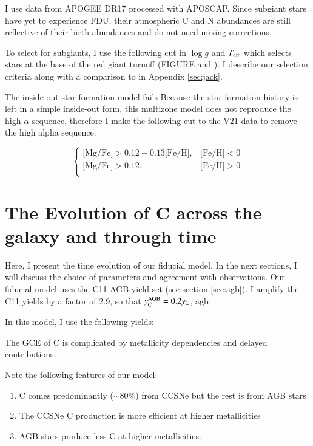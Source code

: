 \documentclass[12pt,oneside]{report}
\newcommand{\Ycagb}{\ensuremath{y_{\rm C}^{\rm AGB}}}
\begin{document}
I use data from APOGEE DR17 \citep{apogee17} processed with APOSCAP. Since subgiant stars have yet to experience FDU, their atmospheric C and N abundances are still reflective of their birth abundances and do not need mixing corrections. 

To select for subgiants, I use the following cut in $\log g$ and $T_{\rm eff}$
which selects stars at the base of the red giant turnoff (FIGURE and
\cite{jack_subgiant}). I describe our selection criteria along with a 
comparison to \citet{fiorenzo+21} in Appendix \ref{sec:jack}. 

The inside-out star formation model fails
Because the star formation history is left in a simple inside-out form, this multizone model does not reproduce the high-$\alpha$ sequence, therefore I make the following cut to the V21 data to remove the high alpha sequence.

\begin{equation}\label{eq:high_alpha}
\begin{cases}
\text{[Mg/Fe]} >0.12-0.13\text{[Fe/H]}, & \text{[Fe/H]}<0\\
\text{[Mg/Fe]} >0.12, & \text{[Fe/H]}>0\\
\end{cases}
\end{equation}




\section{The Evolution of C across the galaxy and through time}


Here, I present the time evolution of our fiducial model. In the next sections, I will discuss the choice of parameters and agreement with observations. Our fiducial model uses the C11 AGB yield set (see section \ref{sec:agb}). I amplify the C11 yields by a factor of 2.9, so that $\Ycagb = 0.2y_{\rm C}$, agb

In this model, I use the following yields:

The GCE of C is complicated by metallicity dependencies and delayed contributions. 

Note the following features of our model:

\begin{enumerate}
    \item C comes predominantly ($\sim80\%$) from CCSNe but the rest is from AGB stars
    \item The CCSNe C production is more efficient at higher metallicities
    \item AGB stars produce less C at higher metallicities.
\end{enumerate}
\end{document}
